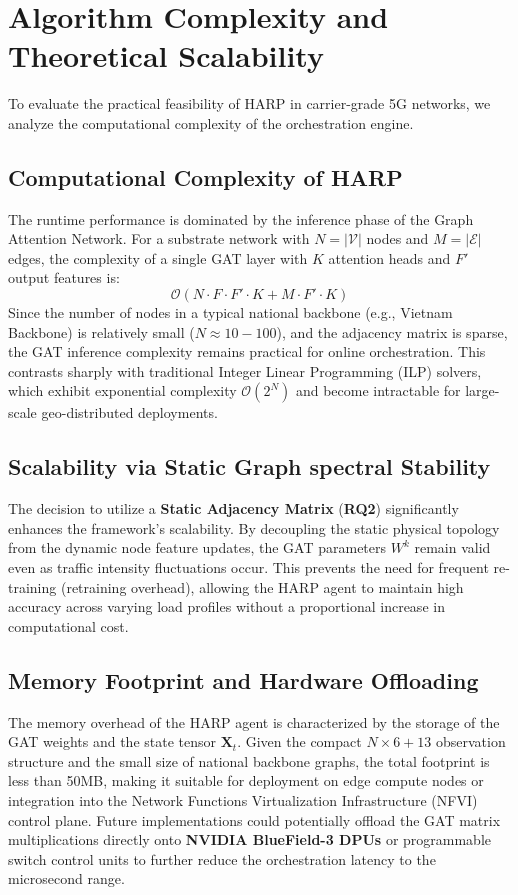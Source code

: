 \documentclass[12pt, a4paper, reqno, oneside]{book}
\begin{document}
\section{Algorithm Complexity and Theoretical Scalability}
To evaluate the practical feasibility of HARP in carrier-grade 5G networks, we analyze the computational complexity of the orchestration engine.

\subsection{Computational Complexity of HARP}
The runtime performance is dominated by the inference phase of the Graph Attention Network. For a substrate network with $N = |\mathcal{V}|$ nodes and $M = |\mathcal{E}|$ edges, the complexity of a single GAT layer with $K$ attention heads and $F'$ output features is:
\begin{equation}
\mathcal{O}(N \cdot F \cdot F' \cdot K + M \cdot F' \cdot K)
\end{equation}
Since the number of nodes in a typical national backbone (e.g., Vietnam Backbone) is relatively small ($N \approx 10-100$), and the adjacency matrix is sparse, the GAT inference complexity remains practical for online orchestration. This contrasts sharply with traditional Integer Linear Programming (ILP) solvers, which exhibit exponential complexity $\mathcal{O}(2^N)$ and become intractable for large-scale geo-distributed deployments.

\subsection{Scalability via Static Graph spectral Stability}
The decision to utilize a \textbf{Static Adjacency Matrix} (\textbf{RQ2}) significantly enhances the framework's scalability. By decoupling the static physical topology from the dynamic node feature updates, the GAT parameters $W^k$ remain valid even as traffic intensity fluctuations occur. This prevents the need for frequent re-training (retraining overhead), allowing the HARP agent to maintain high accuracy across varying load profiles without a proportional increase in computational cost.

\subsection{Memory Footprint and Hardware Offloading}
The memory overhead of the HARP agent is characterized by the storage of the GAT weights and the state tensor $\mathbf{X}_t$. Given the compact $N \times 6 + 13$ observation structure and the small size of national backbone graphs, the total footprint is less than 50MB, making it suitable for deployment on edge compute nodes or integration into the Network Functions Virtualization Infrastructure (NFVI) control plane. Future implementations could potentially offload the GAT matrix multiplications directly onto \textbf{NVIDIA BlueField-3 DPUs} or programmable switch control units to further reduce the orchestration latency to the microsecond range.
\end{document}
